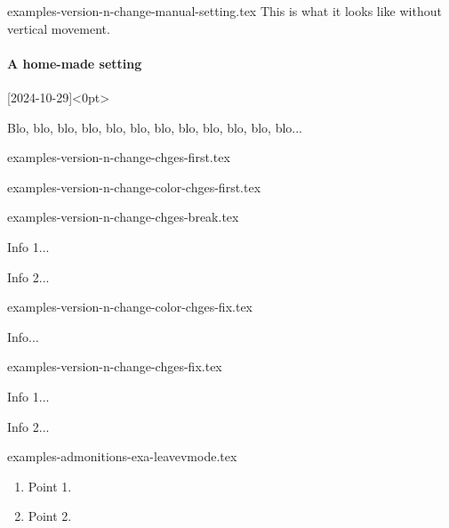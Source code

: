 \begin{filecontents*}[overwrite]{examples-version-n-change-manual-setting.tex}
This is what it looks like without vertical movement.

\paragraph{A home-made setting}%
[2024-10-29]<0pt>

Blo, blo, blo, blo, blo, blo, blo, blo, blo, blo, blo, blo...
\end{filecontents*}


\begin{filecontents*}[overwrite]{examples-version-n-change-chges-first.tex}
\end{filecontents*}


\begin{filecontents*}[overwrite]{examples-version-n-change-color-chges-first.tex}
\end{filecontents*}


\begin{filecontents*}[overwrite]{examples-version-n-change-chges-break.tex}
\begin{tdocbreak}
    \item Info 1...
    \item Info 2...
\end{tdocbreak}
\end{filecontents*}


\begin{filecontents*}[overwrite]{examples-version-n-change-color-chges-fix.tex}
\begin{tdocfix}[col = CadetBlue]
    \item Info...
\end{tdocfix}
\end{filecontents*}


\begin{filecontents*}[overwrite]{examples-version-n-change-chges-fix.tex}
\begin{tdocfix}
    \item Info 1...
    \item Info 2...
\end{tdocfix}
\end{filecontents*}


\begin{filecontents*}[overwrite]{examples-admonitions-exa-leavevmode.tex}
\begin{tdocexa}
    \leavevmode
    \begin{enumerate}
        \item Point 1.

        \item Point 2.
    \end{enumerate}
\end{tdocexa}
\end{filecontents*}



